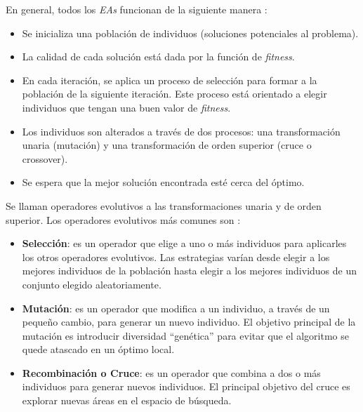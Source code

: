 En general, todos los \emph{EAs} funcionan de la siguiente manera \cite{PSO_0}:
\begin{itemize}
    \item Se inicializa una población de individuos (soluciones potenciales al
problema).
    \item La calidad de cada solución está dada por la función de
\emph{fitness}.
    \item En cada iteración, se aplica un proceso de selección para formar a la
población de la siguiente iteración. Este proceso está orientado a elegir
individuos que tengan una buen valor de \emph{fitness}.
    \item Los individuos son alterados a través de dos procesos: una
transformación unaria (mutación) y una transformación de orden superior (cruce o
crossover).
    \item Se espera que la mejor solución encontrada esté cerca del óptimo.
\end{itemize}

Se llaman operadores evolutivos a las transformaciones unaria y de orden
superior. Los operadores evolutivos más comunes son \cite{PSO_0}:
\begin{itemize}
    \item \textbf{Selección}: es un operador que elige a uno o más individuos para
aplicarles los otros operadores evolutivos. Las estrategias varían desde elegir
a los mejores individuos de la población hasta elegir a los mejores individuos
de un conjunto elegido aleatoriamente.
    \item \textbf{Mutación}: es un operador que modifica a un individuo, a través
de un pequeño cambio, para generar un nuevo individuo. El objetivo principal de
la mutación es introducir diversidad ``genética'' para evitar que el algoritmo
se quede atascado en un óptimo local.
    \item \textbf{Recombinación o Cruce}: es un operador que combina a dos o más
individuos para ge\-ne\-rar nuevos individuos. El principal objetivo del cruce es
explorar nuevas áreas en el espacio de búsqueda.
    
\end{itemize}


